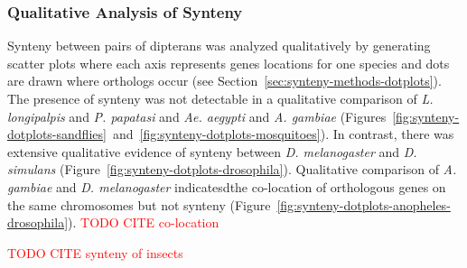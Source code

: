 \subsubsection{Qualitative Analysis of Synteny}
Synteny between pairs of dipterans was analyzed qualitatively by generating scatter plots where each axis represents genes locations for one species and dots are drawn where orthologs occur (see Section~\ref{sec:synteny-methods-dotplots}). The presence of synteny was not detectable in a qualitative comparison of \emph{L. longipalpis} and \emph{P. papatasi} and \emph{Ae. aegypti} and \emph{A. gambiae} (Figures~\ref{fig:synteny-dotplots-sandflies}~and~\ref{fig:synteny-dotplots-mosquitoes}).  In contrast, there was extensive qualitative evidence of synteny between \emph{D. melanogaster} and \emph{D. simulans} (Figure~\ref{fig:synteny-dotplots-drosophila}).  Qualitative comparison of \emph{A. gambiae} and \emph{D. melanogaster} indicatesdthe co-location of orthologous genes on the same chromosomes but not synteny (Figure~\ref{fig:synteny-dotplots-anopheles-drosophila}). \textcolor{red}{TODO CITE co-location}

\textcolor{red}{TODO CITE synteny of insects}


